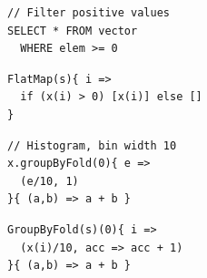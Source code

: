\begin{figure}
\newsavebox{\FlatMapHLL}
\begin{lrbox}{\FlatMapHLL}
\begin{lstlisting}[language=PPLTable]
// Filter positive values
SELECT * FROM vector
  WHERE elem >= 0

\end{lstlisting}
\end{lrbox}

\newsavebox{\FlatMapPPL}
\begin{lrbox}{\FlatMapPPL}
\begin{lstlisting}[language=PPLTable]
FlatMap(s){ i =>
  if (x(i) > 0) [x(i)] else []
}

\end{lstlisting}
\end{lrbox}

\newsavebox{\GroupByFoldHLL}
\begin{lrbox}{\GroupByFoldHLL}
\begin{lstlisting}[language=PPLTable]
// Histogram, bin width 10
x.groupByFold(0){ e =>
  (e/10, 1)
}{ (a,b) => a + b }
\end{lstlisting}
\end{lrbox}

\newsavebox{\GroupByFoldPPL}
\begin{lrbox}{\GroupByFoldPPL}
\begin{lstlisting}[language=PPLTable]
GroupByFold(s)(0){ i =>
  (x(i)/10, acc => acc + 1)
}{ (a,b) => a + b }

\end{lstlisting}
\end{lrbox}

\end{figure}
